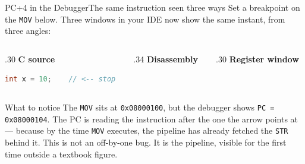 \documentclass[9pt,aspectratio=169,xcolor=table]{beamer}
\begin{document}
{\beamerextras
\begin{frame}[fragile]{PC+4 in the Debugger}{The same instruction seen three ways}
    \leavevmode
    Set a breakpoint on the \texttt{MOV} below. Three windows in your IDE now show the same instant, from three angles:

    \vspace{2mm}
    \begin{columns}[T]
    \begin{column}{.30\textwidth}
        \textbf{C source}
\begin{lstlisting}[language=C, basicstyle=\ttfamily\scriptsize]
int x = 10;    // <-- stop
\end{lstlisting}
    \end{column}
    \begin{column}{.34\textwidth}
        \textbf{Disassembly}
    \end{column}
    \begin{column}{.30\textwidth}
        \textbf{Register window}
        \begin{center}
        \end{center}
    \end{column}
    \end{columns}

    \vspace{3mm}
    \begin{block}{What to notice}
        The \texttt{MOV} sits at \texttt{0x08000100}, but the debugger shows \texttt{PC = 0x08000104}. The PC is reading the instruction \alert{after} the one the arrow points at --- because by the time \texttt{MOV} executes, the pipeline has already \alert{fetched} the \texttt{STR} behind it. This is not an off-by-one bug. It is the pipeline, visible for the first time outside a textbook figure.
    \end{block}
\end{frame}
}
\end{document}
